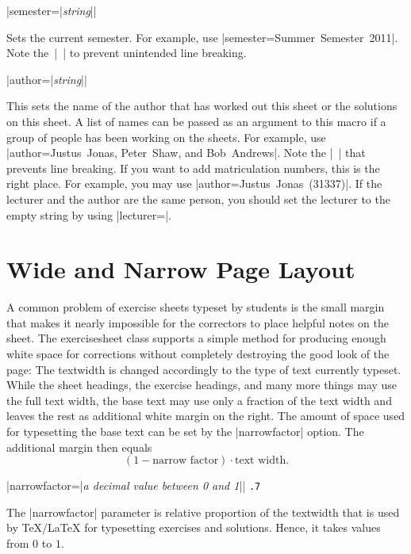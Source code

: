 \documentclass[a4paper,fleqn]{report}
\def\exercisesheet{{exercisesheet}}
\def\syntaxdefaultarg#1{\hfill\texttt{\small #1}\par\smallskip\noindent\ignorespaces}
\def\metaargument#1{\textit{\small #1}}
\begin{document}
\begin{syntax}
  |semester={|\metaargument{string}|}| \syntaxdefaultarg{}
  Sets the current semester. For example, use 
  |semester={Summer~Semester~2011}|. Note the~|~| to prevent
  unintended line breaking.
\end{syntax}

\begin{syntax}
  |author={|\metaargument{string}|}| \syntaxdefaultarg{}
  This sets the name of the author that has worked out this sheet or
  the solutions on this sheet. A list of names can be passed as an
  argument to this macro if a group of people has been working on the
  sheets. For example, use 
  |author={Justus~Jonas, Peter~Shaw, and Bob~Andrews}|. 
  Note the |~| that prevents line breaking. If you want
  to add matriculation numbers, this is the right place. For example,
  you may use |author={Justus~Jonas~(31337)}|. If the lecturer and the
  author are the same person, you should set the lecturer to the empty
  string by using |lecturer={}|.
\end{syntax}


\section{Wide and Narrow Page Layout}

A common problem of exercise sheets typeset by students is the small
margin that makes it nearly impossible for the correctors to place
helpful notes on the sheet. The \exercisesheet{} class supports a
simple method for producing enough white space for corrections without
completely destroying the good look of the page: The textwidth is
changed accordingly to the type of text currently typeset. While the
sheet headings, the exercise headings, and many more things may use
the full text width, the base text may use only a fraction of the text
width and leaves the rest as additional white margin on the right. The
amount of space used for typesetting the base text can be set by the
|narrowfactor| option. The additional margin then equals
\begin{equation*}
  (1 - \text{narrow factor}) \cdot \text{text width}.
\end{equation*}

\begin{syntax}
  |narrowfactor={|\metaargument{a decimal value between 0 and 1}|}| 
  \syntaxdefaultarg{.7}
  The |narrowfactor| parameter is relative proportion of the
  textwidth that is used by \TeX{}/\LaTeX{} for typesetting exercises
  and solutions. Hence, it takes values from $0$ to $1$.
\end{syntax}
\end{document}
